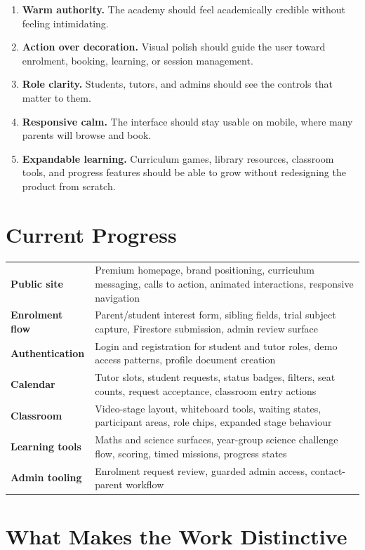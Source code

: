 \documentclass[11pt,a4paper]{article}
\begin{document}
\begin{enumerate}
    \item \textbf{Warm authority.} The academy should feel academically credible without feeling intimidating.
    \item \textbf{Action over decoration.} Visual polish should guide the user toward enrolment, booking, learning, or session management.
    \item \textbf{Role clarity.} Students, tutors, and admins should see the controls that matter to them.
    \item \textbf{Responsive calm.} The interface should stay usable on mobile, where many parents will browse and book.
    \item \textbf{Expandable learning.} Curriculum games, library resources, classroom tools, and progress features should be able to grow without redesigning the product from scratch.
\end{enumerate}

\section{Current Progress}

\begin{tabularx}{\linewidth}{>{\bfseries\color{AnkaInk}}p{4cm} X}
Public site & Premium homepage, brand positioning, curriculum messaging, calls to action, animated interactions, responsive navigation \\
Enrolment flow & Parent/student interest form, sibling fields, trial subject capture, Firestore submission, admin review surface \\
Authentication & Login and registration for student and tutor roles, demo access patterns, profile document creation \\
Calendar & Tutor slots, student requests, status badges, filters, seat counts, request acceptance, classroom entry actions \\
Classroom & Video-stage layout, whiteboard tools, waiting states, participant areas, role chips, expanded stage behaviour \\
Learning tools & Maths and science surfaces, year-group science challenge flow, scoring, timed missions, progress states \\
Admin tooling & Enrolment request review, guarded admin access, contact-parent workflow \\
\end{tabularx}

\section{What Makes the Work Distinctive}
\end{document}
